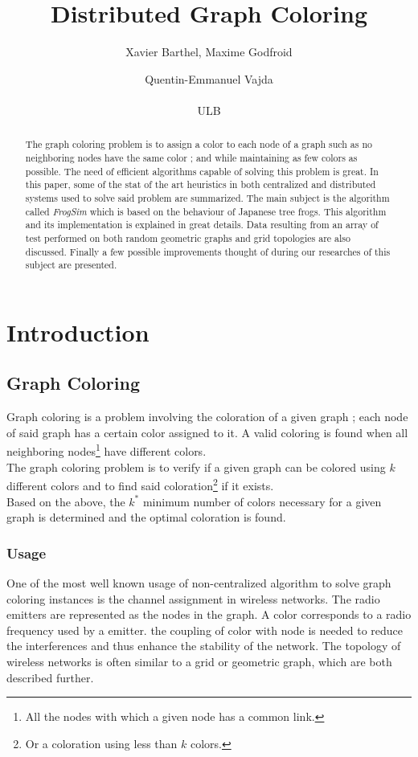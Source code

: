 \documentclass[letterpaper]{article}
\title{Distributed Graph Coloring}
\author{Xavier Barthel, Maxime Godfroid \and Quentin-Emmanuel Vajda \\
\mbox{}\\
ULB}
\begin{document}
\maketitle

\begin{abstract}
The graph coloring problem is to assign a color to each node of a graph such as no neighboring nodes have the same color ; and while maintaining as few colors as possible. The need of efficient algorithms capable of solving this problem is great. In this paper, some of the stat of the art heuristics in both centralized and distributed systems used to solve said problem are summarized. The main subject is the algorithm called \emph{FrogSim} which is based on the behaviour of Japanese tree frogs. This algorithm and its implementation is explained in great details. Data resulting from an array of test performed on both random geometric graphs and grid topologies are also discussed. Finally a few possible improvements thought of during our researches of this subject are presented.
\end{abstract}

\section{Introduction}
\subsection{Graph Coloring}
Graph coloring is a problem involving the coloration of a given graph ; each node of said graph has a certain color assigned to it. A valid coloring is found when all neighboring nodes\footnote{All the nodes with which a given node has a common link.} have different colors.\\

The graph coloring problem is to verify if a given graph can be colored using $k$ different colors and to find said coloration\footnote{Or a coloration using less than $k$ colors.} if it exists.\\

Based on the above, the $k^*$ minimum number of colors necessary for a given graph is determined and the optimal coloration is found.

\subsubsection{Usage}
One of the most well known usage of non-centralized algorithm to solve graph coloring instances is the channel assignment in wireless networks. The radio emitters are represented as the nodes in the graph. A color corresponds to a radio frequency used by a emitter. the coupling of color with node is needed to reduce the interferences and thus enhance the stability of the network. The topology of wireless networks is often similar to a grid or geometric graph, which are both described further.
\end{document}
